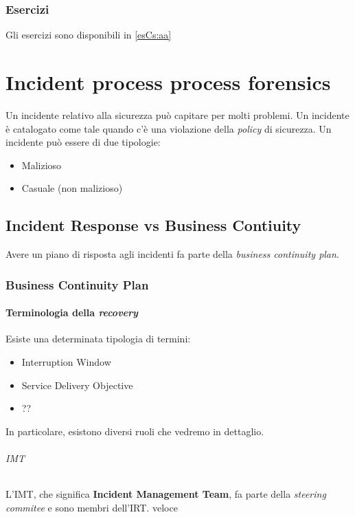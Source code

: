 \section{Esercizi}

Gli esercizi sono disponibili in \ref{esCs:aa}

\part{Incident process process forensics}

Un incidente relativo alla sicurezza può capitare per molti problemi. Un
incidente è catalogato come tale quando c'è una violazione della \textit{policy}
di sicurezza. Un incidente può essere di due tipologie:
\begin{itemize}
\item Malizioso
\item Casuale (non malizioso)
\end{itemize}

\chapter{Incident Response vs Business Contiuity}
\label{IRBC}

Avere un piano di risposta agli incidenti fa parte della \textit{business
continuity plan}.

\section{Business Continuity Plan}

\subsection{Terminologia della \textit{recovery}}
Esiste una determinata tipologia di termini:
\begin{itemize}
\item Interruption Window
\item Service Delivery Objective
\item ?? 
\end{itemize}

In particolare, esistono diversi ruoli che vedremo in dettaglio.

\paragraph*{IMT} L'IMT, che significa \textbf{Incident Management Team}, fa
parte della \textit{steering commitee} e sono membri dell'IRT. %
veloce




